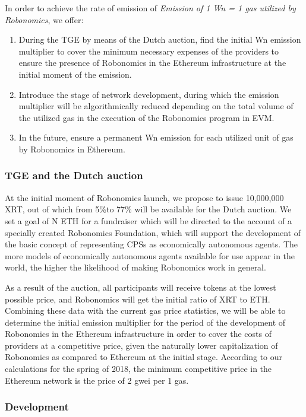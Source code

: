 \documentclass{article}
\begin{document}
In order to achieve the rate of emission of \textit{Emission of 1 Wn = 1 gas utilized by Robonomics}, we offer:
\begin{enumerate}
	\item During the TGE by means of the Dutch auction, find the initial Wn emission multiplier to cover the minimum necessary expenses of the providers to ensure the presence of Robonomics in the Ethereum infrastructure at the initial moment of the emission.
	\item Introduce the stage of network development, during which the emission multiplier will be algorithmically reduced depending on the total volume of the utilized gas in the execution of the Robonomics program in EVM.
	\item In the future, ensure a permanent Wn emission for each utilized unit of gas by Robonomics in Ethereum.
\end{enumerate}

\subsubsection{TGE and the Dutch auction}

At the initial moment of Robonomics launch, we propose to issue 10,000,000 XRT, out of which from 5\%to 77\% will be available for the Dutch auction. We set a goal of N ETH for a fundraiser which will be directed to the account of a specially created Robonomics Foundation, which will support the development of the basic concept of representing CPSs as economically autonomous agents. The more models of economically autonomous agents available for use appear in the world, the higher the likelihood of making Robonomics work in general.
 
As a result of the auction, all participants will receive tokens at the lowest possible price, and Robonomics will get the initial ratio of XRT to ETH. Combining these data with the current gas price statistics, we will be able to determine the initial emission multiplier for the period of the development of Robonomics in the Ethereum infrastructure in order to cover the costs of providers at a competitive price, given the naturally lower capitalization of Robonomics as compared to Ethereum at the initial stage. According to our calculations for the spring of 2018, the minimum competitive price in the Ethereum network is the price of 2 gwei per 1 gas.


\subsubsection{Development}
\end{document}
